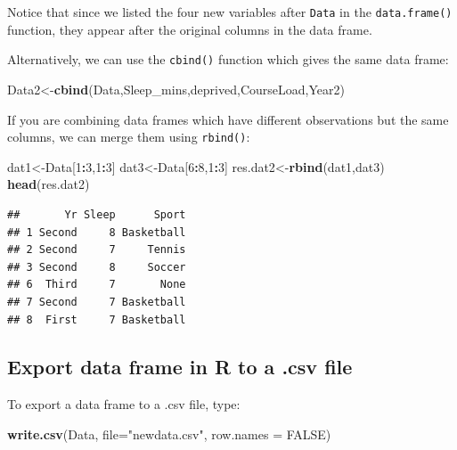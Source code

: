 \documentclass[
]{book}
\newenvironment{Shaded}{\begin{snugshade}}{\end{snugshade}}
\newcommand{\AttributeTok}[1]{\textcolor[rgb]{0.13,0.29,0.53}{#1}}
\newcommand{\ConstantTok}[1]{\textcolor[rgb]{0.56,0.35,0.01}{#1}}
\newcommand{\DecValTok}[1]{\textcolor[rgb]{0.00,0.00,0.81}{#1}}
\newcommand{\FunctionTok}[1]{\textcolor[rgb]{0.13,0.29,0.53}{\textbf{#1}}}
\newcommand{\NormalTok}[1]{#1}
\newcommand{\OtherTok}[1]{\textcolor[rgb]{0.56,0.35,0.01}{#1}}
\newcommand{\SpecialCharTok}[1]{\textcolor[rgb]{0.81,0.36,0.00}{\textbf{#1}}}
\newcommand{\StringTok}[1]{\textcolor[rgb]{0.31,0.60,0.02}{#1}}
\begin{document}
Notice that since we listed the four new variables after \texttt{Data} in the \texttt{data.frame()} function, they appear after the original columns in the data frame.

Alternatively, we can use the \texttt{cbind()} function which gives the same data frame:

\begin{Shaded}
\begin{Highlighting}[]
\NormalTok{Data2}\OtherTok{\textless{}{-}}\FunctionTok{cbind}\NormalTok{(Data,Sleep\_mins,deprived,CourseLoad,Year2)}
\end{Highlighting}
\end{Shaded}

If you are combining data frames which have different observations but the same columns, we can merge them using \texttt{rbind()}:

\begin{Shaded}
\begin{Highlighting}[]
\NormalTok{dat1}\OtherTok{\textless{}{-}}\NormalTok{Data[}\DecValTok{1}\SpecialCharTok{:}\DecValTok{3}\NormalTok{,}\DecValTok{1}\SpecialCharTok{:}\DecValTok{3}\NormalTok{]}
\NormalTok{dat3}\OtherTok{\textless{}{-}}\NormalTok{Data[}\DecValTok{6}\SpecialCharTok{:}\DecValTok{8}\NormalTok{,}\DecValTok{1}\SpecialCharTok{:}\DecValTok{3}\NormalTok{]}
\NormalTok{res.dat2}\OtherTok{\textless{}{-}}\FunctionTok{rbind}\NormalTok{(dat1,dat3)}
\FunctionTok{head}\NormalTok{(res.dat2)}
\end{Highlighting}
\end{Shaded}

\begin{verbatim}
##       Yr Sleep      Sport
## 1 Second     8 Basketball
## 2 Second     7     Tennis
## 3 Second     8     Soccer
## 6  Third     7       None
## 7 Second     7 Basketball
## 8  First     7 Basketball
\end{verbatim}

\hypertarget{export-data-frame-in-r-to-a-.csv-file}{%
\subsection{Export data frame in R to a .csv file}\label{export-data-frame-in-r-to-a-.csv-file}}

To export a data frame to a .csv file, type:

\begin{Shaded}
\begin{Highlighting}[]
\FunctionTok{write.csv}\NormalTok{(Data, }\AttributeTok{file=}\StringTok{"newdata.csv"}\NormalTok{, }\AttributeTok{row.names =} \ConstantTok{FALSE}\NormalTok{)}
\end{Highlighting}
\end{Shaded}
\end{document}
